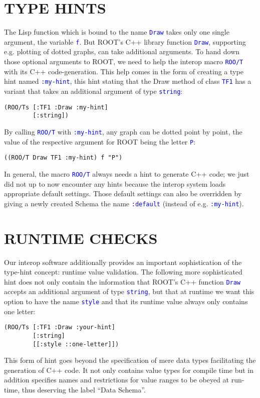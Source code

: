 \documentclass{IEEEcsmag}
\begin{document}
\section{TYPE HINTS}
The Lisp function which is bound to the name \texttt{\textcolor{blue}{Draw}} takes only one single argument, the variable \texttt{\textcolor{blue}{f}}. But ROOT’s C++ library function \texttt{\textcolor{blue}{Draw}}, supporting e.g. plotting of dotted graphs, can take additional arguments. To hand down those optional arguments to ROOT, we need to help the interop macro \texttt{\textcolor{blue}{ROO/T}} with its C++ code-generation. This help comes in the form of creating a type hint named \texttt{\textcolor{blue}{:my-hint}}, this hint stating that the Draw method of class \texttt{\textcolor{blue}{TF1}} has a variant that takes an additional argument of type \texttt{\textcolor{blue}{string}}:
{\color{blue}\begin{verbatim}
(ROO/Ts [:TF1 :Draw :my-hint]
        [:string])
\end{verbatim}}
By calling \texttt{\textcolor{blue}{ROO/T}} with \texttt{\textcolor{blue}{:my-hint}}, any graph can be dotted point by point, the value of the respective argument for ROOT being the letter \texttt{\textcolor{blue}{P}}:
{\color{blue}\begin{verbatim}
((ROO/T Draw TF1 :my-hint) f "P")
\end{verbatim}}
In general, the macro \texttt{\textcolor{blue}{ROO/T}} always needs a hint to generate C++ code; we just did not up to now encounter any hints because the interop system loads appropriate default settings. Those default settings can also be overridden by giving a newly created Schema the name \texttt{\textcolor{blue}{:default}} (instead of e.g. \texttt{\textcolor{blue}{:my-hint}}).\vspace*{-5pt}

\section{RUNTIME CHECKS}
Our interop software additionally provides an important sophistication of the type-hint concept: runtime value validation. The following more sophisticated hint does not only contain the information that ROOT’s C++ function \texttt{\textcolor{blue}{Draw}} accepts an additional argument of type \texttt{\textcolor{blue}{string}}, but that at runtime we want this option to have the name \texttt{\textcolor{blue}{style}} and that its runtime value always only contains one letter:
{\color{blue}\begin{verbatim}
(ROO/Ts [:TF1 :Draw :your-hint]
        [:string]
        [[:style ::one-letter]])
\end{verbatim}}
This form of hint goes beyond the specification of mere data types facilitating the generation of C++ code. It not only contains value types for compile time but in addition specifies names and restrictions for value ranges to be obeyed at run-time, thus deserving the label “Data Schema”.
\end{document}
